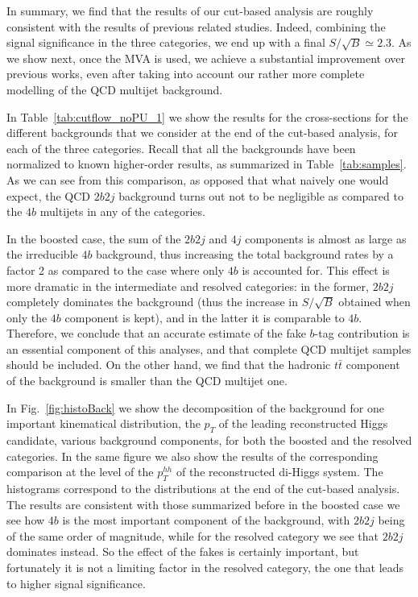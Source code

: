 In summary, we find that the results of our cut-based analysis are roughly
consistent with the results of previous related studies.
%
Indeed, combining the signal significance in the three categories, we end
up with a final $S/\sqrt{B}\simeq 2.3$.
%
As we show next, once the MVA is used, we achieve a substantial
improvement
over previous works, even after taking into account our rather more
complete modelling of the QCD multijet background.



In Table~\ref{tab:cutflow_noPU_1}   we show the results for the cross-sections for the different
backgrounds that we consider at the end of the cut-based analysis, for each
of the three categories.
%
Recall that all the backgrounds have been normalized to known higher-order results,
as summarized in Table~\ref{tab:samples}.
%
As we can see from this comparison, as opposed that what naively one would expect,
the QCD $2b2j$ background turns out not to be negligible as compared to the $4b$
multijets in any of the categories.


In the boosted case, the sum of the $2b2j$ and $4j$ components is almost as large as the
irreducible $4b$ background, thus increasing the total background rates by a factor 2 as compared
to the case where only $4b$ is accounted for.
%
This effect is more dramatic in the intermediate and resolved categories: in the former,
$2b2j$ completely dominates the background (thus the increase in $S/\sqrt{B}$
obtained when only the $4b$ component is kept), and in the latter
it is comparable to $4b$.
%
Therefore, we conclude that an accurate estimate of the fake $b$-tag contribution is
an essential component of this analyses, and that complete QCD multijet samples
should be included.
%
On the other hand, we find that the hadronic $t\bar{t}$ component of the background
is smaller than the QCD multijet one.

In Fig.~\ref{fig:histoBack} we show the decomposition of the background for one important kinematical
distribution, the $p_T$ of the leading reconstructed Higgs candidate, various background
components, for both the boosted and the resolved categories.
%
In the same figure we also show the results of the corresponding comparison
at the level of the $p_T^{hh}$ of the
reconstructed di-Higgs system.
%
The histograms correspond to the distributions at the end of the cut-based
analysis.
%
The results are consistent with those summarized
before in the boosted case we see how $4b$ is the most important
component of the background, with $2b2j$ being of the same order of magnitude, while
for the resolved category we see that $2b2j$ dominates instead.
%
So the effect of the fakes is certainly important, but fortunately it is not a limiting factor
in the resolved category, the one that leads to higher signal significance.

